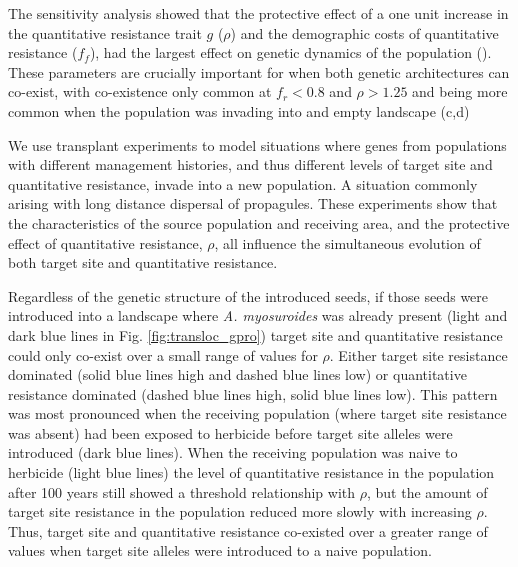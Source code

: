 \documentclass[10pt,letterpaper]{article}
\begin{document}
The sensitivity analysis showed that the protective effect of a one unit increase in the quantitative resistance trait $g$ ($\rho$) and the demographic costs of quantitative resistance ($f_f$), had the largest effect on genetic dynamics of the population (). These parameters are crucially important for when both genetic architectures can co-exist, with co-existence only common at $f_r < 0.8$ and $\rho > 1.25$ and being more common when the  population was invading into and empty landscape (c,d)   

We use transplant experiments to model situations where genes from populations with different management histories, and thus different levels of target site and quantitative resistance, invade into a new population. A situation commonly arising with long distance dispersal of propagules. These experiments show that the characteristics of the source population and receiving area, and the protective effect of quantitative resistance, $\rho$, all influence the simultaneous evolution of both target site and quantitative resistance. 

Regardless of the genetic structure of the introduced seeds, if those seeds were introduced into a landscape where \textit{A. myosuroides} was already present (light and dark blue lines in Fig. \ref{fig:transloc_gpro}) target site and quantitative resistance could only co-exist over a small range of values for $\rho$. Either target site resistance dominated (solid blue lines high and dashed blue lines low) or quantitative resistance dominated (dashed blue lines high, solid blue lines low). This pattern was most pronounced when the receiving population (where target site resistance was absent) had been exposed to herbicide before target site alleles were introduced (dark blue lines). When the receiving population was naive to herbicide (light blue lines) the level of quantitative resistance in the population after 100 years still showed a threshold relationship with $\rho$, but the amount of target site resistance in the population reduced more slowly with increasing $\rho$. Thus, target site and quantitative resistance co-existed over a greater range of values when target site alleles were introduced to a naive population.
\end{document}
